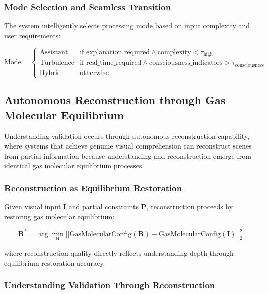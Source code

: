 \documentclass[12pt,a4paper]{article}
\begin{document}
\subsubsection{Mode Selection and Seamless Transition}

The system intelligently selects processing mode based on input complexity and user requirements:

\begin{equation}
\text{Mode} = \begin{cases}
\text{Assistant} & \text{if explanation\_required} \land \text{complexity} < \tau_{\text{high}} \\
\text{Turbulence} & \text{if real\_time\_required} \land \text{consciousness\_indicators} > \tau_{\text{consciousness}} \\
\text{Hybrid} & \text{otherwise}
\end{cases}
\end{equation}

\subsection{Autonomous Reconstruction through Gas Molecular Equilibrium}

Understanding validation occurs through autonomous reconstruction capability, where systems that achieve genuine visual comprehension can reconstruct scenes from partial information because understanding and reconstruction emerge from identical gas molecular equilibrium processes.

\subsubsection{Reconstruction as Equilibrium Restoration}

Given visual input $\mathbf{I}$ and partial constraints $\mathbf{P}$, reconstruction proceeds by restoring gas molecular equilibrium:

\begin{equation}
\mathbf{R}^* = \arg\min_{\mathbf{R}} ||\text{GasMolecularConfig}(\mathbf{R}) - \text{GasMolecularConfig}(\mathbf{I})||_2^2
\end{equation}

where reconstruction quality directly reflects understanding depth through equilibrium restoration accuracy.

\subsubsection{Understanding Validation Through Reconstruction}
\end{document}
